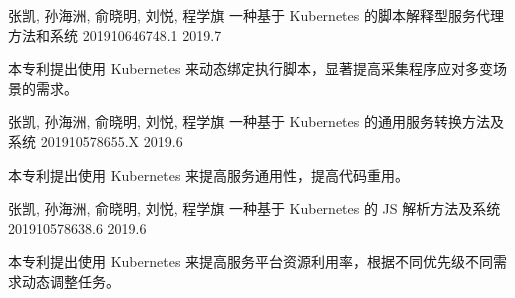 
\begin{cventries}



\cventry
{张凯, 孙海洲, 俞晓明, 刘悦, 程学旗} %
{一种基于 Kubernetes 的脚本解释型服务代理方法和系统} %
{201910646748.1} %
{2019.7} %
{
  \begin{cvitems} %
    \item {
      本专利提出使用 Kubernetes 来动态绑定执行脚本，显著提高采集程序应对多变场景的需求。
    }
  \end{cvitems}
}

  \cventry
    {张凯, 孙海洲, 俞晓明, 刘悦, 程学旗} %
    {一种基于 Kubernetes 的通用服务转换方法及系统} %
    {201910578655.X} %
    {2019.6} %
    {
      \begin{cvitems} %
        \item {
          本专利提出使用 Kubernetes 来提高服务通用性，提高代码重用。
        }
      \end{cvitems}
    }

\cventry
{张凯, 孙海洲, 俞晓明, 刘悦, 程学旗} %
{一种基于 Kubernetes 的 JS 解析方法及系统} %
{201910578638.6} %
{2019.6} %
{
  \begin{cvitems} %
    \item {
      本专利提出使用 Kubernetes 来提高服务平台资源利用率，根据不同优先级不同需求动态调整任务。
    }
  \end{cvitems}
}

\end{cventries}
